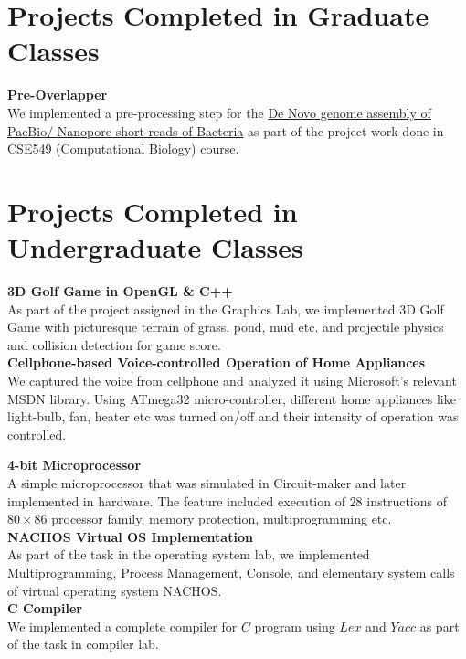 \documentclass[margin,line,pifont,palatino,courier]{res}
\begin{document}
\begin{resume}
\section{\sc Projects Completed in Graduate \\ Classes}
\textbf{Pre-Overlapper}\\
We implemented a pre-processing step for the
\href{http://schatzlab.cshl.edu/teaching/2012/pacbioasm.shtml}{De Novo
genome assembly of PacBio/ Nanopore short-reads of Bacteria} as part of
the project work done in CSE549 (Computational Biology) course.

\section{\sc Projects Completed in Undergraduate Classes}
\textbf{3D Golf Game in OpenGL \& C++}\\
As part of the project assigned in the Graphics Lab, we implemented 3D Golf Game with picturesque
terrain of grass, pond, mud etc. and projectile physics and collision detection for game score.\\
\textbf{Cellphone-based Voice-controlled Operation of Home Appliances}\\
We captured the voice
from cellphone and analyzed it using Microsoft's relevant MSDN library. Using ATmega32 
micro-controller, different home appliances
like light-bulb, fan, heater etc was turned on/off and their intensity of operation was
controlled.\\
\begin{comment}
\textbf{Inventory Management System of Onik Ltd.}\\
We studied the system of cellphone selling company, developed extensive UML and prototype based on
it, validated the design and completed the development of the system using ASP,NET, Oracle and
Crystal Report.\\
\end{comment}
\textbf{4-bit Microprocessor}\\
A simple microprocessor that was simulated in Circuit-maker and later implemented in hardware. The
feature included execution of $28$ instructions of $80 \times 86$ processor family, memory
protection, multiprogramming etc.\\
\textbf{NACHOS Virtual OS Implementation}\\
As part of the task in the operating system lab, we implemented Multiprogramming,
Process Management, Console, and elementary system calls of virtual operating system NACHOS.\\
\textbf{C Compiler}\\
We implemented a complete compiler for $C$ program using $Lex$ and $Yacc$ as part of the task in
compiler lab.\\

\end{resume}
\end{document}
